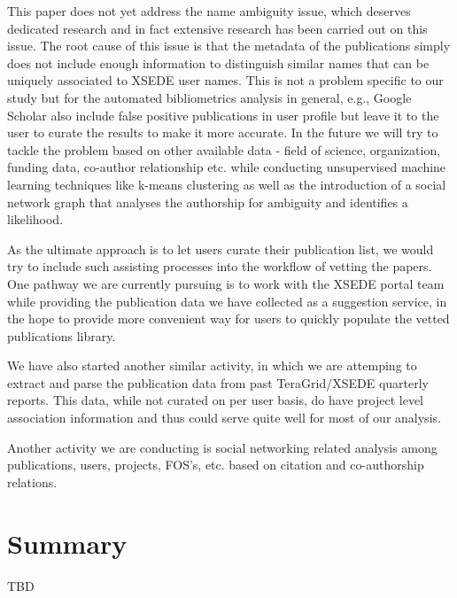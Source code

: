 \documentclass{sig-alternate}
\begin{document}
This paper does not yet address the name ambiguity issue, which deserves dedicated research and in fact extensive research has been carried out on this issue. The root cause of this issue is that the metadata of the publications simply does not include enough information to distinguish similar names that can be uniquely associated to XSEDE user names. This is not a problem specific to our study but for the automated bibliometrics analysis in general, e.g., Google Scholar also include false positive publications in user profile but leave it to the user to curate the results to make it more accurate. In the future we will try to tackle the problem based on other available data - field of science, organization, funding data, co-author relationship etc. while conducting unsupervised machine learning techniques like k-means clustering as well as the introduction of a social network graph that analyses the authorship for ambiguity and identifies a likelihood.
 
As the ultimate approach is to let users curate their publication list, we would try to include such assisting processes into the workflow of vetting the papers. One pathway we are currently pursuing is to work with the XSEDE portal team while providing the publication data we have collected as a suggestion service, in the hope to provide more convenient way for users to quickly populate the vetted publications library. 
 
We have also started another similar activity, in which we are attemping to  extract and parse the publication data from past TeraGrid/XSEDE quarterly reports. This data, while not curated on per user basis, do have project level association information and thus could serve quite well for most of our analysis. 
 
Another activity we are conducting is social networking related analysis among publications, users, projects, FOS's, etc. based on citation and co-authorship relations.

\section{Summary}

TBD 
 
 
 
\end{document}
